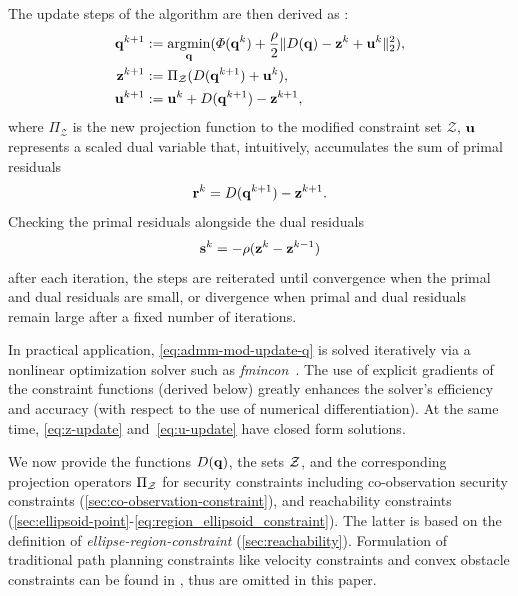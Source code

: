 \documentclass[10pt,twocolumn,twoside]{IEEEtran}
\begin{document}
The update steps of the algorithm are then derived as \cite{Boyd2011}:
\begin{subequations}\label{eq:ADMMupdate}
	\begin{align}
		\mathbf{q}^{k+1}&:=\operatorname*{\arg\!\min}_{\mathbf{q}}(\varPhi(\mathbf{q}^k) +\frac{\rho}{2}\lVert D(\mathbf{q})-\mathbf{z}^k+\mathbf{u}^k\rVert_2^2),\label{eq:admm-mod-update-q}\\
		\mathbf{z}^{k+1}&:=\Pi_\mathcal{Z}(D(\mathbf{q}^{k+1})+\mathbf{u}^k), \label{eq:z-update} \\
		\mathbf{u}^{k+1}&:=\mathbf{u}^k+D(\mathbf{q}^{k+1})-\mathbf{z}^{k+1}, \label{eq:u-update}
	\end{align}
\end{subequations}
where $\Pi_\mathcal{Z}$ is the new projection function to the modified constraint set $\mathcal{Z}$, $\mathbf{u}$ represents a scaled dual variable that, intuitively, accumulates the sum of primal residuals
\begin{equation}\label{eq:primal-residual}
	\mathbf{r}^{k}=D(\mathbf{q}^{k+1})-\mathbf{z}^{k+1}.
\end{equation}
Checking the primal residuals alongside the dual residuals 
\begin{equation}\label{eq:dual-residual}
	\mathbf{s}^{k}=-\rho(\mathbf{z}^{k}-\mathbf{z}^{k-1})
\end{equation}
after each iteration, the steps are reiterated until convergence when the primal and dual residuals are small, or divergence when primal and dual residuals remain large after a fixed number of iterations.
\begin{remark}
In practical application, \eqref{eq:admm-mod-update-q} is solved iteratively via a nonlinear optimization solver such as \emph{fmincon}~\cite{MATLAB:fmincon}. The use of explicit gradients of the constraint functions (derived below) greatly enhances the solver's efficiency and accuracy (with respect to the use of numerical differentiation). At the same time, \eqref{eq:z-update} and~\eqref{eq:u-update} have closed form solutions.
\end{remark}

We now provide the functions $D(\mathbf{q})$, the sets $\mathcal{Z}$, and the corresponding projection operators $\Pi_{\mathcal{Z}}$ for security constraints including co-observation security constraints (\cref{sec:co-observation-constraint}), and reachability constraints (\cref{sec:ellipsoid-point}-\cref{eq:region_ellipsoid_constraint}). The latter is based on the definition of \emph{ellipse-region-constraint} (\cref{sec:reachability}).
Formulation of traditional path planning constraints like velocity constraints and convex obstacle constraints can be found in \cite{yang2020multi}, thus are omitted in this paper.
\end{document}
